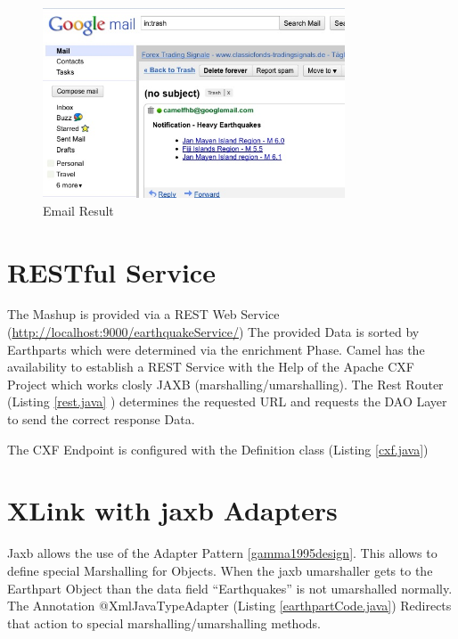\documentclass[11pt,english,ngerman, headsepline]{scrreprt}
\begin{document}
 \begin{figure}[h!]
	\begin{center}
	\includegraphics[width=0.8\textwidth]{pics/EmailResult.jpg}
	\end{center}
	\caption{Email Result}
	\label{EmailResult} 
   \end{figure}

 




\chapter{RESTful Service}

The Mashup is provided via a REST Web Service
(\url{http://localhost:9000/earthquakeService/})
The provided Data is sorted by Earthparts which were determined via the
enrichment Phase.
Camel has the availability to establish a REST Service with the Help of the
Apache CXF Project which works closly JAXB (marshalling/umarshalling). 
The Rest Router (Listing \ref{rest.java} ) determines the requested URL and
requests the DAO Layer \cite{fowler2002patterns} to send the correct response
Data.



The CXF Endpoint is configured with the Definition class (Listing
\ref{cxf.java})
   


\chapter{XLink with jaxb Adapters}
Jaxb allows the use of the Adapter Pattern \ref{gamma1995design}. This allows to
define special Marshalling for Objects.
When the jaxb umarshaller gets to the Earthpart Object than the data field
``Earthquakes'' is not umarshalled normally. 
The Annotation @XmlJavaTypeAdapter (Listing \ref{earthpartCode.java}) Redirects that
action to special marshalling/umarshalling methods. 
\end{document}
